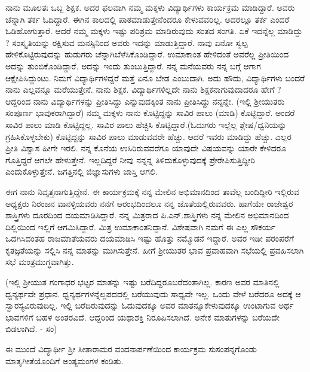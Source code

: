 {ನಾನು ಮೂಲತಃ ಒಬ್ಬ ಶಿಕ್ಷಕ. ಅದರ ಫಲವಾಗಿ ನಮ್ಮ ಮಕ್ಕಳು ವಿದ್ಯಾರ್ಥಿಗಳು ಕಾರ್ಯಕ್ರಮ ಮಾಡಿದ್ದಾರೆ. ಅವರು ಚೆನ್ನಾಗಿ ತರ್ಕ ಓದಿದ್ದಾರೆ. ಈಗಿನ ಕಾಲದಲ್ಲಿ ಪಾಠಮಾಡುತ್ತೇನೆಂದರೂ ಕೇಳುವವರಿಲ್ಲ. ಅದರಲ್ಲೂ ತರ್ಕ ಎಂದರೆ ಓಡಿಹೋಗು\-ತ್ತಾರೆ. ಆದರೆ ನಮ್ಮ ಮಕ್ಕಳು ಇಷ್ಟು ಪರಿಶ್ರಮ ಮಾಡಿರುವುದು ಸಂತದ ಸಂಗತಿ. ಏಕೆ ಇದನ್ನೆಲ್ಲ ಮಾಡಿದ್ದು ? ಸಂಸ್ಕೃತಿಯನ್ನು ರಕ್ಷಿಸುವ ಮನಸ್ಸಿನಿಂದ ಅವರು ಇದನ್ನು ಮಾಡುತ್ತಿದ್ದಾರೆ. ನಾವು ಏನೋ ಸ್ವಲ್ಪ ಹೇಳಿಕೊಟ್ಟಿರುವುದನ್ನು ಹುಡುಗರು ಚೆನ್ನಾಗಿ\break ಬೆಳೆಸಿಕೊಂಡಿದ್ದಾರೆ. ಉಮಾಕಾಂತ ಹೇಳಿದಂತೆ ಅವರೆಲ್ಲ ಪ್ರೀತಿಯಿಂದ ಅದನ್ನು ತುಂಬಿಕೊಂಡಿದ್ದಾರೆ. ಅದನ್ನು ಇಂದು ತುಂಬುತ್ತಿದ್ದಾರೆ. ನನ್ನ ಮನೆಯವರು ನನ್ನ ಬಗ್ಗೆ ಆಗಾಗ ಆಕ್ಷೇಪಿಸಿದ್ದುಂಟು. ನಿಮಗೆ ವಿದ್ಯಾರ್ಥಿಗಳಿದ್ದರೆ ಮತ್ತೆ ಏನೂ ಬೇಡ ಎಂಬುದಾಗಿ. ಅದು ಹೌದು, ವಿದ್ಯಾರ್ಥಿಗಳು ಬಂದರೆ ನಾನು ಎಲ್ಲವನ್ನೂ ಮರೆಯುತ್ತೇನೆ. ನಾನು ಶಿಕ್ಷಕ. ವಿದ್ಯಾರ್ಥಿಗಳಿಲ್ಲದೇ ನಾನು ಶಿಕ್ಷಕನಾಗುವುದಾದರೂ ಹೇಗೆ ? ಆದ್ದರಿಂದ ನಾನು ವಿದ್ಯಾರ್ಥಿಗಳನ್ನು ಪ್ರೀತಿಸಿದ್ದು ಎನ್ನುವುದಕ್ಕಿಂತ ನಾನು ಪ್ರೀತಿಸಿದ್ದು ನನ್ನನ್ನೇ. (ಇಲ್ಲಿ ಶ್ರೀಯುತರು ಸಂಪೂರ್ಣ ಭಾವುಕರಾಗಿದ್ದಾರೆ) ನಮ್ಮ ಮಕ್ಕಳು ನಾನು \hbox{ಕೊಟ್ಟಿದ್ದನ್ನು} ಸಾವಿರ ಪಾಲು (ಮಾಡಿ) ಕೊಟ್ಟಿದ್ದಾರೆ. ಅಂದರೆ ಸಾವಿರ ಪಾಲು ಮಾಡಿ \hbox{ಕೊಟ್ಟಿದ್ದಲ್ಲ}. ಸಾವಿರ ಪಾಲು ಹೆಚ್ಚಿಸಿ ಕೊಟ್ಟಿದ್ದಾರೆ.(ಓದುಗರು ಇಲ್ಲೆಲ್ಲ ಶ್ಲೇಷ/ಧ್ವನಿಯನ್ನು ಗ್ರಹಿಸಿಕೊಳ್ಳ\-ಬೇಕು) ಕೊಟ್ಟಿದ್ದನ್ನು ಸಾವಿರ ಪಾಲು ಮಾಡುವವರೇ ಹೆಚ್ಚು. ಆದರೆ ಇವರು ಮಾಡಿದ್ದು ಹೆಚ್ಚು. ಎಲ್ಲರ ಪ್ರೀತಿ ವಿಶ್ವಾಸ ಹೀಗೇ ಇರಲಿ. ನನ್ನ ಕೊನೆಯ ಉಸಿರಿರುವ\-ವರೆಗೂ ಯಾವುದೇ ವಿಷಯವನ್ನು ಯಾರೇ ಕೇಳಿದರೂ ಗೊತ್ತಿದ್ದರೆ ಆಗಲೇ ಹೇಳುತ್ತೇನೆ. ಇಲ್ಲದಿದ್ದರೆ ನೀವು ನನ್ನನ್ನ ತಿಳಿದುಕೊಳ್ಳುವುದಕ್ಕೆ ಪ್ರೇರೇಪಿಸುತ್ತಿದ್ದೀರಿ ಎಂದುಕೊಳ್ಳುತ್ತೇನೆ. ಜಗತ್ತಿನಲ್ಲಿ ಜಿಜ್ಞಾಸುಗಳು ಜಾಸ್ತಿ ಆಗಲಿ. 
\vskip 4pt

ಈಗ ನಾನು ನಿವೃತ್ತನಾಗುತ್ತಿದ್ದೇನೆ. ಈ ಕಾರ್ಯಕ್ರಮಕ್ಕೆ ನನ್ನ ಮೇಲಿನ ಅಭಿಮಾನದಿಂದ ತಾವೆಲ್ಲ  ಬಂದಿದ್ದೀರಿ ಇಲ್ಲಿರುವ ಅಧ್ಯಕ್ಷರು ನಿರಂಜನ ವಾನಳ್ಳಿಯವರು ನನಗೆ ಆರಂಭದಿಂದಲೂ ನನ್ನ ಜೊತೆಯಲ್ಲಿರುವವರು. ಹಾಗೆಯೇ ರಾಜೇಶ್ವರ ಶಾಸ್ತ್ರಿಗಳು ದೂರದಿಂದ ದಯಮಾಡಿಸಿದ್ದಾರೆ. ನನ್ನ ಮಿತ್ರರಾದ ಪಿ.ಎನ್.ಶಾಸ್ತ್ರಿಗಳು ನನ್ನ ಮೇಲಿನ ಅಭಿಮಾನದಿಂದ ದಿಲ್ಲಿಯಿಂದ ಇಲ್ಲಿಗೆ ಆಗಮಿಸಿದ್ದಾರೆ. ಮಿತ್ರ ಉಮಾಕಾಂತನಿದ್ದಾನೆ. ವಿಶೇಷವಾಗಿ ನಮಗೆ ಈ ಎಲ್ಲ ಸೌಕರ್ಯ ಒದಗಿಸಿದಂತಹ ರಾಜಮಾತೆಯವರು ದಯಮಾಡಿಸಿ ಇಷ್ಟು ಹೊತ್ತು ನಮ್ಮೊಡನೆ ಇದ್ದಾರೆ. ಅವರ ಇಡೀ ಪರಂಪರೆಗೆ ಕೃತಜ್ಞತೆಯನ್ನು ಸಲ್ಲಿಸಿ ನನ್ನ ಮಾತನ್ನು ಮುಗಿಸುತ್ತೇನೆ. \enginline{-} ಹೀಗೆ ಶ್ರೀಯುತರ ಭಾವ ಪ್ರವಾಹವಾಗಿ ಸಭೆಯಲ್ಲಿ ಪ್ರವಹಿಸಲಾಗಿ ಸಭೆ ಮಂತ್ರಮುಗ್ಧವಾಗಿತ್ತು.
\vskip 4pt

(ಇಲ್ಲಿ ಶ್ರೀಯುತ ಗಂಗಾಧರ ಭಟ್ಟರ ಮಾತನ್ನು ಇಷ್ಟು ಬರೆದಿದ್ದರೂ\break ಬರೆದಂತಾಗಿಲ್ಲ. ಕಾರಣ ಅವರ ಮಾತಿನಲ್ಲಿ ಧ್ವನ್ಯರ್ಥವೇ ಪ್ರಧಾನ. ಧ್ವನ್ಯರ್ಥಗಳನ್ನೆಲ್ಲ\break ಪದದಲ್ಲಿ ಬರೆಯುವುದು ಸಾಧ್ಯವೇ ಇಲ್ಲ. ಒಂದು ವೇಳೆ ಬರೆದರೂ ಅದಕ್ಕೆ ಆ ಸ್ವಾರಸ್ಯ\-ವಿರುವುದಿಲ್ಲ. ಇಲ್ಲಿ ಬರೆದಿರುವುದನ್ನು ಓದುವುದಕ್ಕೂ ಅವರ ಮಾತನ್ನೂ\break ಕೇಳು\-ವುದಕ್ಕೂ ಉಂಟಾಗುವ ಅರ್ಥ ಭಾವಗಳಿಗೆ ಬಹಳ ಅಂತರವಿದೆ. ಆದ್ದರಿಂದ ಯಥಾಶಕ್ತಿ ನಿರೂಪಿಸಲಾಗಿದೆ. ಅನೇಕ ಮಾತುಗಳನ್ನು ಬರೆಯದೇ ಬಿಡಲಾಗಿದೆ. - ಸಂ) 

ಈ ಮುಂದೆ ವಿದ್ಯಾರ್ಥೀ ಶ್ರೀ ಸೀತಾರಾಮರ ವಂದನಾರ್ಪಣೆಯಿಂದ ಕಾರ್ಯಕ್ರಮ ಸುಸಂಪನ್ನಗೊಂಡು ಮಾತೃಗೀತೆಯೊಂದಿಗೆ ಅಂತ್ಯಮಂಗಳ ಕಂಡಿತು. 

}
